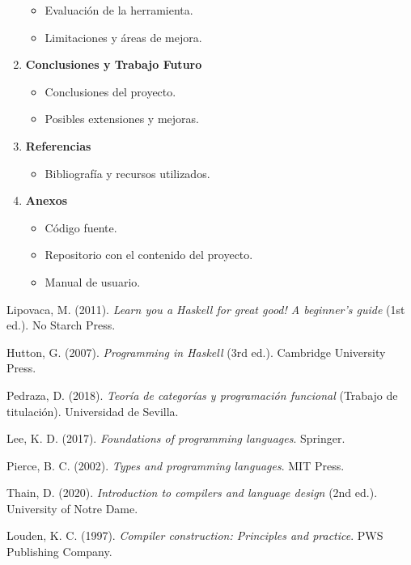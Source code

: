 \documentclass[12pt]{article}
\begin{document}
\begin{enumerate}
  \begin{itemize}
  \item Evaluación de la herramienta.
  \item Limitaciones y áreas de mejora.
  \end{itemize}

\item \textbf{Conclusiones y Trabajo Futuro}

  \begin{itemize}
  \item Conclusiones del proyecto.
  \item Posibles extensiones y mejoras.
  \end{itemize}
\item \textbf{Referencias}

  \begin{itemize}
  \item Bibliografía y recursos utilizados.
  \end{itemize}

\item \textbf{Anexos}

  \begin{itemize}
  \item Código fuente.
  \item Repositorio con el contenido del proyecto.
  \item Manual de usuario.
  \end{itemize}
\end{enumerate}

\begin{thebibliography}{10}
  Lipovaca, M. (2011). \textit{Learn you a Haskell for great good! A beginner's guide} (1st ed.). No Starch Press.

  Hutton, G. (2007). \textit{Programming in Haskell} (3rd ed.). Cambridge University Press.

  Pedraza, D. (2018). \textit{Teoría de categorías y programación funcional} (Trabajo de titulación). Universidad de Sevilla.
  
  Lee, K. D. (2017). \textit{Foundations of programming languages}. Springer.
  
  Pierce, B. C. (2002). \textit{Types and programming languages}. MIT Press.

  Thain, D. (2020). \textit{Introduction to compilers and language design} (2nd ed.). University of Notre Dame.

  Louden, K. C. (1997). \textit{Compiler construction: Principles and practice}. PWS Publishing Company.
  
\end{thebibliography}
\end{document}
